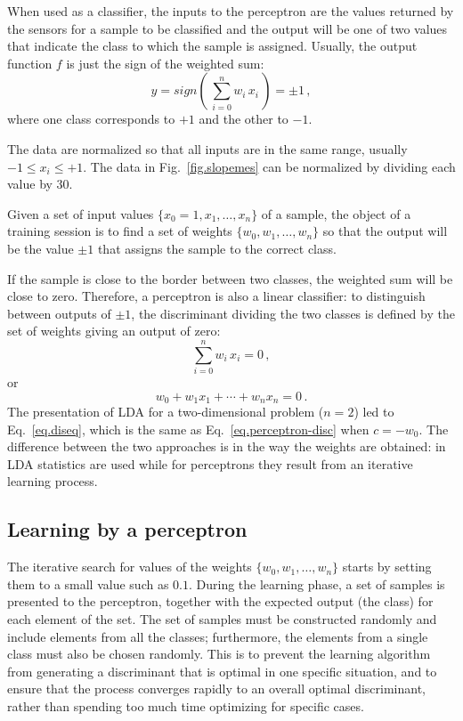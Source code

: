 When used as a classifier, the inputs to the perceptron are the values returned by the sensors for a sample to be classified and the output will be one of two values that indicate the class to which the sample is assigned. Usually, the output function $f$ is just the sign of the weighted sum:
\begin{equation}
y=sign\left(\,\sum_{i=0}^{n} w_i\,x_i\,\right)=\pm 1\,,\label{eq.perceptron-output}
\end{equation}
where one class corresponds to $+1$ and the other to $-1$.

The data are normalized so that all inputs are in the same range, usually $-1\leq x_i\leq +1$. The data in Fig.~\ref{fig.slopemes} can be normalized by dividing each value by $30$.

Given a set of input values $\{x_0=1,x_1,\ldots,x_n\}$ of a sample, the object of a training session is to find a set of weights $\{w_0,w_1,\ldots,w_n\}$ so that the output will be the value $\pm 1$ that assigns the sample to the correct class.

If the sample is close to the border between two classes, the weighted sum will be close to zero. Therefore, a perceptron is also a linear classifier: to distinguish between outputs of $\pm 1$, the discriminant dividing the two classes is defined by the set of weights giving an output of zero:
\[
\sum_{i=0}^{n} w_i\,x_i=0\,,
\]
or
\begin{equation}
w_0 + w_1x_1 + \cdots + w_nx_n = 0\,.\label{eq.perceptron-disc}
\end{equation}
The presentation of LDA for a two-dimensional problem ($n=2$) led to Eq.~\ref{eq.diseq}, which is the same as Eq.~\ref{eq.perceptron-disc} when $c=-w_0$. The difference between the two approaches is in the way the weights are obtained: in LDA statistics are used while for perceptrons they result from an iterative learning process.

\subsection{Learning by a perceptron}

The iterative search for values of the weights $\{w_0,w_1,\ldots,w_n\}$ starts by setting them to a small value such as $0.1$. During the learning phase, a set of samples is presented to the perceptron, together with the expected output (the class) for each element of the set. The set of samples must be constructed randomly and include elements from all the classes; furthermore, the elements from a single class must also be chosen randomly. This is to prevent the learning algorithm from generating a discriminant that is optimal in one specific situation, and to ensure that the process converges rapidly to an overall optimal discriminant, rather than spending too much time optimizing for specific cases.

